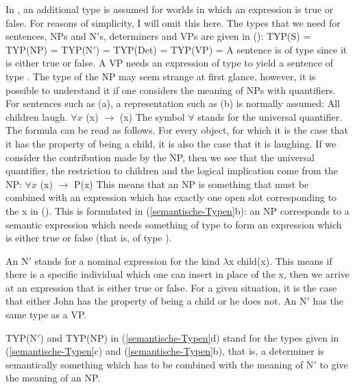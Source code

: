 In , an additional type is assumed for worlds in which an expression is true or false. For reasons of simplicity, I will omit this here. The types
that we need for sentences, NPs and N$'$s, determiners and VPs are given in ():
\eal
\label{semantische-Typen}
\ex TYP(S)   = 
\ex TYP(NP)  = 
\ex TYP(N$'$)  = 
\ex TYP(Det) = 
\ex TYP(VP)  = 
\zl
A sentence is of type  since it is either true or false. A VP needs an expression of type  to yield a sentence of type .
The type of the NP may seem strange at first glance, however, it is possible to understand it if one considers the meaning of NPs with quantifiers.
For sentences such as (a), a representation such as (b) is normally assumed:
\eal
\ex All children laugh.
\ex $\forall x$ (x) $\to$ (x)
\zl
The symbol $\forall$ stands for the universal quantifier. The formula can
be read as follows. For every object, for which it is the case that it has the property of being a
child, it is also the case that it is laughing. If we consider the contribution made by the NP, then we see that
the universal quantifier, the restriction to children and the logical implication come from the NP:
\ea
$\forall x$ (x) $\to$ P(x)
\z
This means that an NP is something that must be combined with an expression which has exactly one open slot corresponding to the x in (). This is formulated in (\ref{semantische-Typen}b):
an NP corresponds to a semantic expression which needs something of type  to form an expression which is either true or false (that is, of type ).

An N$'$ stands for a nominal expression for the kind  $\lambda$x child(x). This means if there is a specific individual which one can insert in place of the x, then we arrive at an
expression that is either true or false. For a given situation, it is the case that either John has the property of being a child or he does not. An N$'$ has the same type as
a VP.

TYP(N$'$) and TYP(NP) in (\ref{semantische-Typen}d) stand for the types given in (\ref{semantische-Typen}c) and
(\ref{semantische-Typen}b), that is, a determiner is semantically something which has to be combined with the meaning of N$'$
to give the meaning of an NP.

